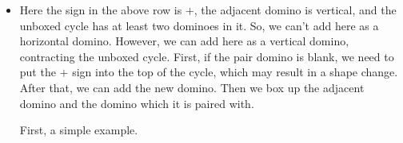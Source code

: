 \documentclass[12pt]{article}
\numberwithin{equation}{section}
\newcommand{\verticalDominoMaybe}[3]{\filldraw [dominoMaybeStyle] (#2 - 1 + \eps,  #1 - 1 + \eps) rectangle + (1 - \teps,2 -\teps) node [dominoText] {$#3$};}
\newcommand{\verticalDominoMaybeShift}[4]{\filldraw [dominoMaybeStyle] (#2 - 1 + #4 + \eps,  #1 - 1 + \eps) rectangle + (1 - \teps,2 -\teps) node [dominoText] {$#3$};}
\begin{document}
\begin{itemize}
\begin{itemize}
\begin{figure}[H]
      \end{figure}
      \begin{figure}[H]
        \centering
      \end{figure}
    \end{itemize}
    \item Here the sign in the above row is $+$,
    the adjacent domino is vertical, and the unboxed cycle has at least two dominoes in it.
    So, we can't add here as a horizontal domino.
    However, we can add here as a vertical domino, contracting the unboxed cycle.
    First, if the pair domino is blank, we need to put the $+$ sign into the top of the cycle, which may result in a shape change.
    After that, we can add the new domino.
    Then we box up the adjacent domino and the domino which it is paired with.

    First, a simple example.
    \begin{figure}[H]
      \centering
\end{figure}
\end{itemize}
\end{document}
